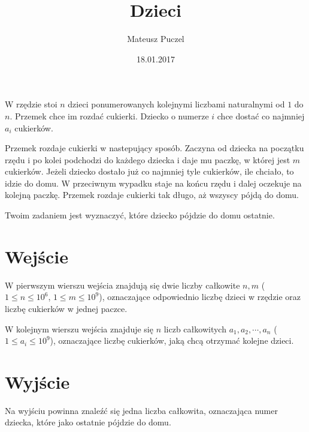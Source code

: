 \documentclass[zad,zawodnik,utf8]{sinol}
\title{Dzieci}
\author{Mateusz Puczel} %
\date{18.01.2017}
\begin{document}
\begin{tasktext}%

W rzędzie stoi $n$ dzieci ponumerowanych kolejnymi liczbami naturalnymi od $1$ do $n$. Przemek chce im rozdać cukierki.
Dziecko o numerze $i$ chce dostać co najmniej $a_i$ cukierków.

Przemek rozdaje cukierki w nastepujący sposób. Zaczyna od dziecka na początku rzędu i po kolei podchodzi do każdego dziecka i daje mu paczkę, w której jest $m$ cukierków.
Jeżeli dziecko dostało już co najmniej tyle cukierków, ile chciało, to idzie do domu. W przeciwnym wypadku staje na końcu rzędu i dalej oczekuje na kolejną paczkę.
Przemek rozdaje cukierki tak długo, aż wszyscy pójdą do domu.

Twoim zadaniem jest wyznaczyć, które dziecko pójdzie do domu ostatnie.

  \section{Wejście}
W pierwszym wierszu wejścia znajdują się dwie liczby całkowite $n, m$ ($1 \leq n \leq 10^6$, $1 \leq m \leq 10^9$), oznaczające odpowiednio
liczbę dzieci w rzędzie oraz liczbę cukierków w jednej paczce.

W kolejnym wierszu wejścia znajduje się $n$ liczb całkowitych $a_1, a_2, \cdots, a_n$ ($1 \leq a_i \leq 10^9$), oznaczające liczbę cukierków, jaką chcą otrzymać kolejne dzieci.

  \section{Wyjście}
Na wyjściu powinna znaleźć się jedna liczba całkowita, oznaczająca numer dziecka, które jako ostatnie pójdzie do domu.
  
\makecompactexample

\end{tasktext}
\end{document}

